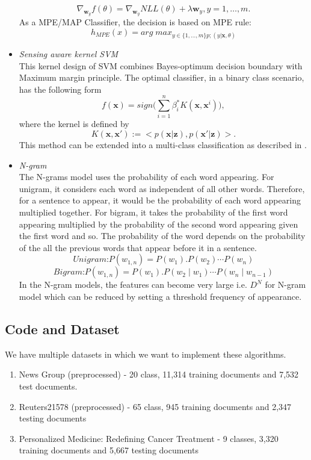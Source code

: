 \documentclass[10pt,twocolumn,letterpaper]{article}
\begin{document}
\begin{itemize}
	\[\nabla_{\pmb{w}_y}f(\theta) = \nabla_{\pmb{w}_y}NLL(\theta)+\lambda\pmb{w}_{y}, y=1,\ldots,m.\]
	As a MPE/MAP Classifier, the decision is based on MPE rule:
	\begin{equation*}
		h_{MPE}(x) = arg \; max_{y \in\{1,\ldots,m\}p;(y|\pmb{x},\theta)}
	\end{equation*}
	\item \textit{Sensing aware kernel SVM}\\
	This kernel design of SVM combines Bayes-optimum decision boundary with Maximum margin principle. The optimal classifier, in a binary class scenario, has the following form \[f(\pmb{x})=sign\bigg( \sum_{i=1}^{n}\beta^*_iK(\pmb{x},\pmb{x}^i)\bigg),\] where the kernel is defined by \[K(\pmb{x},\pmb{x}') := <p(\pmb{x}|\pmb{z}),p(\pmb{x}'|\pmb{z})> .\]This method can be extended into a multi-class classification as described in \cite{ding2014sensing}.
	\item \textit{N-gram}\\
	 The N-grams model uses the probability of each word appearing. For unigram, it considers each word as independent of all other words. Therefore, for a sentence to appear, it would be the probability of each word appearing multiplied together. For bigram, it takes the probability of the first word appearing multiplied by the probability of the second word appearing given the first word and so. The probability of the word depends on the probability of the all the previous words that appear before it in a sentence. \cite{song1999general} 
	\begin{equation*}
	\textit{Unigram:}  P(w_{1,n})  = P(w_1).P(w_2) \cdots P(w_n)
	\end{equation*}
	\begin{equation*}
	\textit{Bigram:}  P(w_{1,n})  = P(w_1).P(w_2 \mid  w_1) \cdots P(w_n \mid w_{n-1})
	\end{equation*}
	In the N-gram models, the features can become very large i.e. $D^N$ for N-gram model which can be reduced by setting a threshold frequency of appearance\cite{furnkranz1998study}.  \\
			
	
\end{itemize}

\subsection{Code and Dataset}\label{data}
We have multiple datasets in which we want to implement these algorithms. 
\begin{enumerate}
	\item News Group (preprocessed) - 20 class, 11,314 training documents and  7,532 test documents.
	\item Reuters21578 (preprocessed) - 65 class, 945 training documents and  2,347 testing documents \cite{dataset}
	\item Personalized Medicine: Redefining Cancer Treatment - 9 classes,  3,320 training documents and 5,667 testing documents  \cite{kaggledataset}
\end{enumerate}
\end{document}
